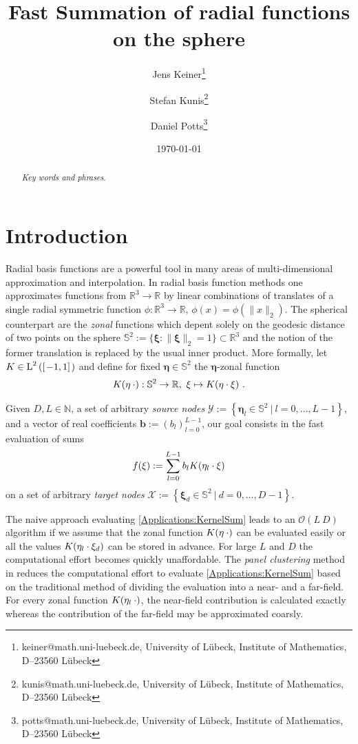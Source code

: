 \documentclass[11pt,a4paper,twoside,bibtotoc]{scrartcl}
\title{
Fast Summation of radial functions on the sphere}
\date{\today}
\author{
Jens Keiner\thanks{keiner@math.uni-luebeck.de, University of
  L\"ubeck, Institute of Mathematics, D--23560 L\"ubeck} \and
Stefan Kunis\thanks{kunis@math.uni-luebeck.de, University of
  L\"ubeck, Institute of Mathematics, D--23560 L\"ubeck} \and
Daniel Potts\thanks{potts@math.uni-luebeck.de, University of
  L\"ubeck, Institute of Mathematics, D--23560 L\"ubeck} 
}
\theoremstyle{plain}
\theoremstyle{definition}
\theoremstyle{remark}
\newcommand{\N}{\ensuremath{\mathbb{N}}}
\newcommand{\R}{\ensuremath{\mathbb{R}}}
\newcommand{\pset}[3]{\ensuremath{\left\{#1\ \left#2\ #3\right.\right\rbrace}}
\newcommand{\twosphere}{\ensuremath{\mathbb{S}^2}}
\newcommand{\Ln}[2]{\ensuremath{\text{\rm{L}}^{#1}\left(#2\right)}}
\newcommand{\interv}[4]{\ensuremath{\left#1\left.#2,#3\right#4\right.}}
\newcommand{\fun}[2]{\ensuremath{#1{\hspace{-0.4ex}}\left(#2\right)}}
\newcommand{\paren}[1]{\ensuremath{\left(#1\right)}}
\newcommand{\bigo}[1]{\ensuremath{\mathcal{O}\paren{#1}}}
\newcommand{\mb}[1]{\mathbf{#1}}
\newcommand{\V}[1]{\mb{#1}}
\numberwithin{equation}{section}
\numberwithin{table}{section}
\numberwithin{figure}{section}
\begin{document}
\maketitle

\begin{abstract}
\medskip


\noindent
{\it Key words and phrases}.  
\end{abstract}


\section{Introduction}\label{sect:1}

Radial basis functions are a powerful tool in many areas of multi-dimensional 
approximation and interpolation.
In radial basis function methods one approximates functions from $\R^3
\rightarrow \R$ by linear combinations of translates of a single radial 
symmetric function $\phi:\R^3 \rightarrow \R, \, \phi(x)=\phi(\|x\|_2)$.
The spherical counterpart are the \emph{zonal} functions which depent solely
on the geodesic distance of two points on the sphere $\twosphere:=\{
\V{\xi}: \|\V{\xi}\|_2=1\} \subset \R^3$ and the notion of the former
translation is replaced by the usual inner product.
More formally, let $K \in \Ln{2}{\interv{[}{-1}{1}{]}}$ and define for fixed
$\V{\eta} \in \twosphere$ the $\V{\eta}$-zonal function 
\[
  \fun{K}{\V{\eta} \: \cdot}: \twosphere \rightarrow \R,\ \V{\xi} \mapsto
  \fun{K}{\V{\eta} \cdot \V{\xi}}\,.%
\]

Given $D,L\in \N$, a set of arbitrary \emph{source nodes} $\mathcal{Y} :=
\pset{\V{\eta}_{l} \in \twosphere}{|}{l = 0,\ldots,L-1}$, and a vector of
real coefficients $\V{b}:=(b_{l})_{l=0}^{L-1}$, our goal consists in the fast
evaluation of sums 
\begin{equation}
  \label{Applications:KernelSum}
  \fun{f}{\xi} := \sum_{l = 0}^{L-1} b_{l} \fun{K}{\V{\eta}_{l} \cdot \V{\xi}}
\end{equation}
on a set of arbitrary \emph{target nodes} $\mathcal{X} := \pset{\V{\xi}_{d}
  \in \twosphere}{|}{d=0,\ldots,D-1}$.

The naive approach evaluating \eqref{Applications:KernelSum} leads to
an $\bigo{L\:D}$ algorithm if we assume that the zonal function
$\fun{K}{\V{\eta} \: \cdot}$ can be evaluated easily or all the values
$\fun{K}{\V{\eta}_{l} \cdot \V{\xi}_{d}}$ can be stored in advance. 
For large $L$ and $D$ the computational effort becomes quickly unaffordable.
The \emph{panel clustering} method in \cite{FrGlSch98} reduces the
computational effort to evaluate \eqref{Applications:KernelSum} based on the
traditional method of dividing the evaluation into a near- and a far-field.
For every zonal function $\fun{K}{\V{\eta}_l \: \cdot}$, the near-field
contribution is calculated exactly whereas the contribution of the far-field
may be approximated coarsly.
\end{document}
